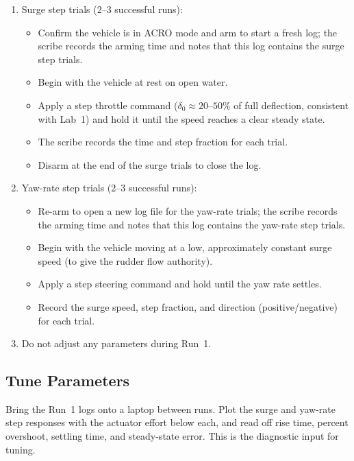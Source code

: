 \documentclass[../../book.tex]{subfiles}
\begin{document}
\begin{enumerate}
  \item Surge step trials (2--3 successful runs):
    \begin{itemize}
      \item Confirm the vehicle is in ACRO mode and arm to start a fresh log; the scribe records the arming time and notes that this log contains the surge step trials.
      \item Begin with the vehicle at rest on open water.
      \item Apply a step throttle command ($\delta_0 \approx 20$--$50\%$ of full deflection, consistent with Lab~1) and hold it until the speed reaches a clear steady state.
      \item The scribe records the time and step fraction for each trial.
      \item Disarm at the end of the surge trials to close the log.
    \end{itemize}

  \item Yaw-rate step trials (2--3 successful runs):
    \begin{itemize}
      \item Re-arm to open a new log file for the yaw-rate trials; the scribe records the arming time and notes that this log contains the yaw-rate step trials.
      \item Begin with the vehicle moving at a low, approximately constant surge speed (to give the rudder flow authority).
      \item Apply a step steering command and hold until the yaw rate settles.
      \item Record the surge speed, step fraction, and direction (positive/negative) for each trial.
    \end{itemize}

  \item Do not adjust any parameters during Run~1.
\end{enumerate}


\subsection{Tune Parameters}
\label{sec:tune}

Bring the Run~1 logs onto a laptop between runs.  Plot the surge and yaw-rate step responses with the actuator effort below each, and read off rise time, percent overshoot, settling time, and steady-state error.  This is the diagnostic input for tuning.
\end{document}
